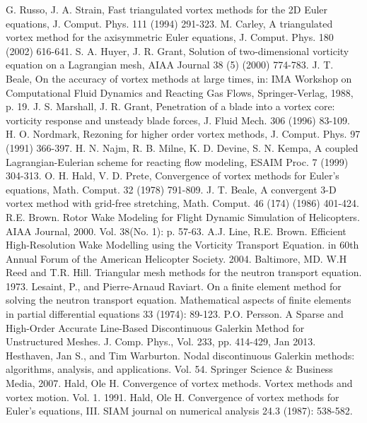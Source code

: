 \documentclass[letterpaper,12pt]{report}
\begin{document}
\begin{thebibliography}{9}
G. Russo, J. A. Strain, Fast triangulated vortex methods for the 2D Euler equations, J. Comput. Phys. 111 (1994) 291-323.
M. Carley, A triangulated vortex method for the axisymmetric Euler equations, J. Comput. Phys. 180 (2002) 616-641.
S. A. Huyer, J. R. Grant, Solution of two-dimensional vorticity equation on a Lagrangian mesh, AIAA Journal 38 (5) (2000) 774-783.
J. T. Beale, On the accuracy of vortex methods at large times, in: IMA Workshop on Computational Fluid Dynamics and Reacting Gas Flows, Springer-Verlag, 1988, p. 19.
J. S. Marshall, J. R. Grant, Penetration of a blade into a vortex core: vorticity response and unsteady blade forces, J. Fluid Mech. 306 (1996) 83-109.
H. O. Nordmark, Rezoning for higher order vortex methods, J. Comput. Phys. 97 (1991) 366-397.
H. N. Najm, R. B. Milne, K. D. Devine, S. N. Kempa, A coupled Lagrangian-Eulerian scheme for reacting flow modeling, ESAIM Proc. 7 (1999) 304-313.
O. H. Hald, V. D. Prete, Convergence of vortex methods for Euler's equations, Math. Comput. 32 (1978) 791-809.
J. T. Beale, A convergent 3-D vortex method with grid-free stretching, Math. Comput. 46 (174) (1986) 401-424.
 R.E. Brown. Rotor Wake Modeling for Flight Dynamic Simulation of Helicopters. AIAA Journal, 2000. Vol. 38(No. 1): p. 57-63.
A.J. Line, R.E. Brown. Efficient High-Resolution Wake Modelling using the Vorticity Transport Equation. in 60th Annual Forum of the American Helicopter Society. 2004. Baltimore, MD.
W.H Reed and T.R. Hill. Triangular mesh methods for the neutron transport equation. 1973.
Lesaint, P., and Pierre-Arnaud Raviart. On a finite element method for solving the neutron transport equation. Mathematical aspects of finite elements in partial differential equations 33 (1974): 89-123.
P.O. Persson. A Sparse and High-Order Accurate Line-Based Discontinuous Galerkin Method for Unstructured Meshes. J. Comp. Phys., Vol. 233, pp. 414-429, Jan 2013.
Hesthaven, Jan S., and Tim Warburton. Nodal discontinuous Galerkin methods: algorithms, analysis, and applications. Vol. 54. Springer Science \& Business Media, 2007.
Hald, Ole H. Convergence of vortex methods. Vortex methods and vortex motion. Vol. 1. 1991.
Hald, Ole H. Convergence of vortex methods for Euler's equations, III. SIAM journal on numerical analysis 24.3 (1987): 538-582.

\end{thebibliography}
\end{document}
